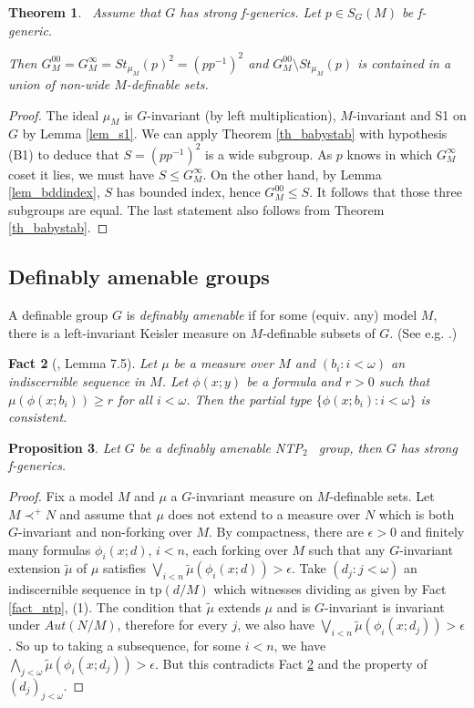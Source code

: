 \documentclass[12pt]{article}
\newtheorem{thm}{Theorem}[section]
\newtheorem{prop}[thm]{Proposition}
\newtheorem{fait}[thm]{Fact}
\theoremstyle{definition}
\theoremstyle{mystyle}
\theoremstyle{remark}
\newcommand{\ntp}{NTP$_2$ }
\newcommand{\tp}{\mathrm{tp}}
\begin{document}
\begin{thm}\label{th_stab}\
Assume that $G$ has strong f-generics. Let $p\in S_G(M)$ be f-generic.

Then $G^{00}_M=G^{\infty}_M=St_{\mu_M}(p)^2=(pp^{-1})^2$ and $G^{00}_M\setminus St_{\mu_M}(p)$ is contained in a union of non-wide $M$-definable sets.
\end{thm}
\begin{proof}
The ideal $\mu_M$ is $G$-invariant (by left multiplication), $M$-invariant and S1 on $G$ by Lemma \ref{lem_s1}. We can apply Theorem \ref{th_babystab} with hypothesis (B1) to deduce that $S=(pp^{-1})^2$ is a wide subgroup. As $p$ knows in which $G^{\infty}_M$ coset it lies, we must have $S\leq G^{\infty}_M$. On the other hand, by Lemma \ref{lem_bddindex}, $S$ has bounded index, hence $G^{00}_M\leq S$. It follows that those three subgroups are equal. The last statement also follows from Theorem \ref{th_babystab}.
\end{proof}

\subsection{Definably amenable groups}

A definable group $G$ is \emph{definably amenable} if for some (equiv. any) model $M$, there is a left-invariant Keisler measure on $M$-definable subsets of $G$. (See e.g. \cite[Chapter 8]{NIPbook}.)

\begin{fait}[\cite{NIPbook}, Lemma 7.5]\label{fact_meas}
Let $\mu$ be a measure over $M$ and $(b_i : i<\omega)$ an indiscernible sequence in $M$. Let $\phi(x;y)$ be a formula and $r>0$ such that $\mu(\phi(x;b_i))\geq r$ for all $i<\omega$. Then the partial type $\{ \phi(x;b_i) : i<\omega \}$ is consistent.
\end{fait}

\begin{prop}
Let $G$ be a definably amenable \ntp~group, then $G$ has strong f-generics.
\end{prop}
\begin{proof}
Fix a model $M$ and $\mu$ a $G$-invariant measure on $M$-definable sets. Let $M\prec^{+} N$ and assume that $\mu$ does not extend to a measure over $N$ which is both $G$-invariant and non-forking over $M$. By compactness, there are $\epsilon >0$ and finitely many formulas $\phi_i(x;d)$, $i<n$, each forking over $M$ such that any $G$-invariant extension $\tilde \mu$ of $\mu$ satisfies $\bigvee_{i<n} \tilde \mu(\phi_i(x;d))>\epsilon$.
Take $(d_j:j<\omega)$ an indiscernible sequence in $\tp(d/M)$ which witnesses dividing as given by Fact \ref{fact_ntp}, (1). The condition that $\tilde \mu$ extends $\mu $ and is $G$-invariant is invariant under $Aut(N/M)$, therefore for every $j$, we also have $\bigvee_{i<n} \tilde \mu(\phi_i(x;d_j))> \epsilon$. So up to taking a subsequence, for some $i<n$, we have $\bigwedge_{j<\omega} \tilde \mu(\phi_i(x;d_j))>\epsilon$. But this contradicts Fact \ref{fact_meas} and the property of $(d_j)_{j<\omega}$.
\end{proof}
\end{document}
